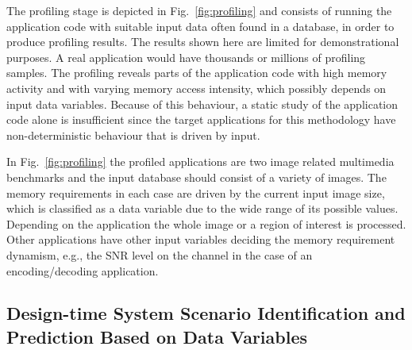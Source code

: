 The profiling stage is depicted in Fig.~\ref{fig:profiling} and consists of running the application code with suitable input data often found in a database, in order to produce profiling results. The results shown here are limited for demonstrational purposes. A real application would have thousands or millions of profiling samples. The profiling reveals parts of the application code with high memory activity and with varying memory access intensity, which possibly depends on input data variables. Because of this behaviour, a static study of the application code alone is insufficient since the target applications for this methodology have non-deterministic behaviour that is driven by input.


In Fig.~\ref{fig:profiling} the profiled applications are two image related multimedia benchmarks and the input database should consist of a variety of images. The memory requirements in each case are driven by the current input image size, which is classified as a data variable due to the wide range of its possible values. Depending on the application the whole image or a region of interest is processed. 
Other applications have other input variables deciding the memory requirement dynamism, e.g., the SNR level on the channel in the case of an encoding/decoding application.

\subsection{Design-time System Scenario Identification and Prediction Based on Data Variables}

